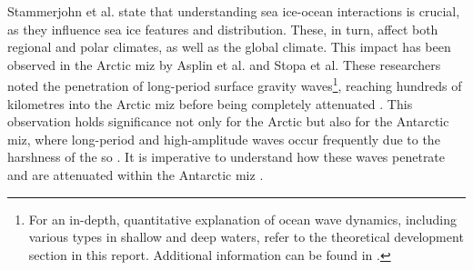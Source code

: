 
Stammerjohn et al. \cite{Stammerjohn2012} state that understanding sea ice-ocean interactions is crucial, as they influence sea ice features and distribution. These, in turn, affect both regional and polar climates, as well as the global climate. This impact has been observed in the Arctic \acs{miz} by Asplin et al. \cite{Asplin2012} and Stopa et al. \cite{Stopa2018} These researchers noted the penetration of long-period surface gravity waves\footnote{For an in-depth, quantitative explanation of ocean wave dynamics, including various types in shallow and deep waters, refer to the theoretical development section in this report. Additional information can be found in \cite{Holthuijsen2007}.}, reaching hundreds of kilometres into the Arctic \acs{miz} before being completely attenuated \cite{Asplin2012,Stopa2018}. This observation holds significance not only for the Arctic but also for the Antarctic \acs{miz}, where long-period and high-amplitude waves occur frequently due to the harshness of the \acs{so} \cite{Young2020}. It is imperative to understand how these waves penetrate and are attenuated within the Antarctic \acs{miz} \cite{Alberello2021}.

